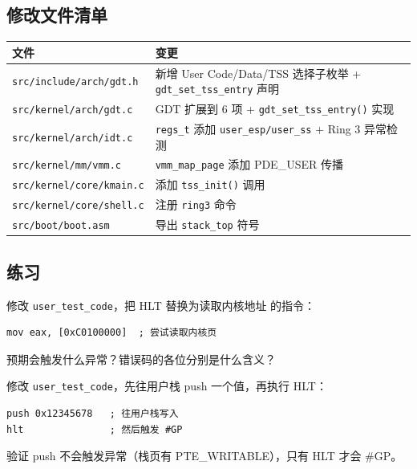 \subsection{修改文件清单}

\begin{center}
\begin{tabular}{ll}
\toprule
\textbf{文件} & \textbf{变更} \\
\midrule
\texttt{src/include/arch/gdt.h}    & 新增 User Code/Data/TSS 选择子枚举 + \texttt{gdt\_set\_tss\_entry} 声明 \\
\texttt{src/kernel/arch/gdt.c}     & GDT 扩展到 6 项 + \texttt{gdt\_set\_tss\_entry()} 实现 \\
\texttt{src/kernel/arch/idt.c}     & \texttt{regs\_t} 添加 \texttt{user\_esp/user\_ss} + Ring 3 异常检测 \\
\texttt{src/kernel/mm/vmm.c}       & \texttt{vmm\_map\_page} 添加 PDE\_USER 传播 \\
\texttt{src/kernel/core/kmain.c}   & 添加 \texttt{tss\_init()} 调用 \\
\texttt{src/kernel/core/shell.c}   & 注册 \texttt{ring3} 命令 \\
\texttt{src/boot/boot.asm}         & 导出 \texttt{stack\_top} 符号 \\
\bottomrule
\end{tabular}
\end{center}

\subsection{练习}

\begin{exercise}[title={练习 1：Ring 3 读取内核地址}]
修改 \texttt{user\_test\_code}，把 HLT 替换为读取内核地址  的指令：
\begin{lstlisting}[style=nasmstyle]
mov eax, [0xC0100000]  ; 尝试读取内核页
\end{lstlisting}
预期会触发什么异常？错误码的各位分别是什么含义？
\end{exercise}

\begin{exercise}[title={练习 2：Ring 3 写用户栈}]
修改 \texttt{user\_test\_code}，先往用户栈 push 一个值，再执行 HLT：
\begin{lstlisting}[style=nasmstyle]
push 0x12345678   ; 往用户栈写入
hlt               ; 然后触发 #GP
\end{lstlisting}
验证 push 不会触发异常（栈页有 PTE\_WRITABLE），只有 HLT 才会 \#GP。
\end{exercise}

